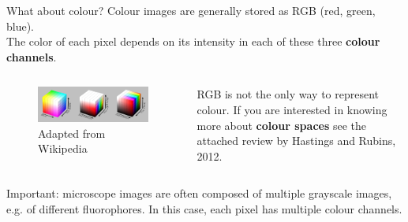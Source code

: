 \documentclass[9pt, aspectratio=169]{beamer}
\begin{document}
\begin{frame}
    {What about colour?}
    Colour images are generally stored as RGB (red, green, blue).\\
    The color of each pixel depends on its intensity in each of these three \textbf{colour channels}.

    \pause

    \begin{columns}
        \begin{column}{0.6\textwidth}
            \begin{figure}
                \includegraphics[width=\textwidth]{colorspaces.png}
                \caption{\color{gray}Adapted from Wikipedia}
            \end{figure}
        \end{column}
        \begin{column}{0.4\textwidth}
            RGB is not the only way to represent colour. If you are interested in knowing more about \textbf{colour spaces} see the attached review by Hastings and Rubins, 2012.
        \end{column}
    \end{columns}
    \pause
    Important: microscope images are often composed of multiple grayscale images, e.g. of different fluorophores. In this case, each pixel has multiple colour channels.
\end{frame}
\end{document}
